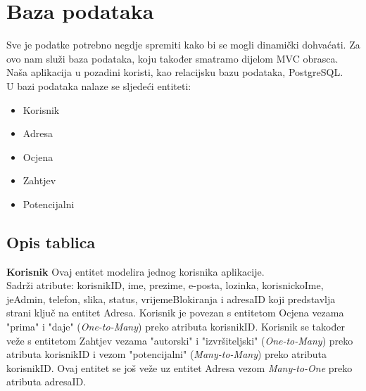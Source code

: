 			
			
			\section{Baza podataka}
			
			Sve je podatke potrebno negdje spremiti kako bi se mogli dinamički dohvaćati. Za ovo nam služi baza podataka, koju također smatramo dijelom MVC obrasca. Naša aplikacija u pozadini koristi, kao relacijsku bazu podataka, PostgreSQL.
			\\
			U bazi podataka nalaze se sljedeći entiteti:
			\begin{itemize}
				\item Korisnik
				\item Adresa
				\item Ocjena
				\item Zahtjev
				\item Potencijalni
			\end{itemize}
			
			\subsection{Opis tablica}
			
			
			\textbf{Korisnik} Ovaj entitet modelira jednog korisnika aplikacije.\\
			Sadrži atribute: korisnikID, ime, prezime, e-posta, lozinka, korisnickoIme, jeAdmin, telefon, slika, status, vrijemeBlokiranja i
			adresaID koji predstavlja strani ključ na entitet Adresa. Korisnik je povezan s entitetom Ocjena vezama "prima" i "daje" (\textit{One-to-Many}) preko atributa korisnikID. Korisnik se također veže s entitetom Zahtjev vezama "autorski" i "izvršiteljski" (\textit{One-to-Many}) preko atributa korisnikID i vezom "potencijalni" (\textit{Many-to-Many}) preko atributa korisnikID. Ovaj entitet se još veže uz entitet Adresa vezom \textit{Many-to-One} preko atributa adresaID.
			
